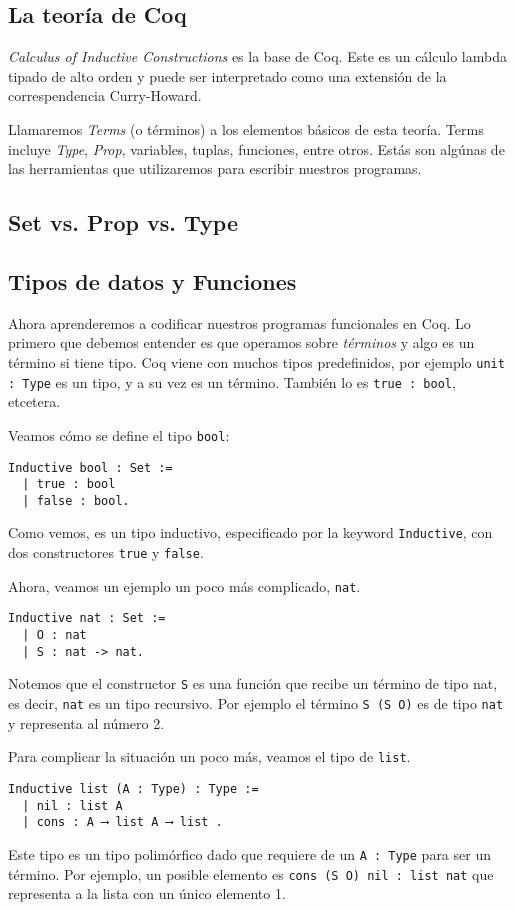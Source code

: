 \subsection{La teoría de Coq}

\textit{Calculus of Inductive Constructions} es la base de Coq. Este es un cálculo lambda tipado de alto orden y puede ser interpretado como una extensión de la correspendencia Curry-Howard.

Llamaremos \textit{Terms} (o términos) a los elementos básicos de esta teoría. Terms incluye \textit{Type}, \textit{Prop}, variables, tuplas, funciones, entre otros. Estás son algúnas de las herramientas que utilizaremos para escribir nuestros programas.

\subsection{Set vs. Prop vs. Type}

\subsection{Tipos de datos y Funciones}

Ahora aprenderemos a codificar nuestros programas funcionales en Coq. Lo primero que debemos entender es que operamos sobre \textit{términos} y algo es un término si tiene tipo. Coq viene con muchos tipos predefinidos, por ejemplo \lstinline{unit : Type} es un tipo, y a su vez es un término. También lo es \lstinline{true : bool}, etcetera.

Veamos cómo se define el tipo \lstinline{bool}:
\begin{lstlisting}
Inductive bool : Set :=
  | true : bool
  | false : bool.
\end{lstlisting}
Como vemos, es un tipo inductivo, especificado por la keyword \lstinline{Inductive}, con dos constructores \lstinline{true} y \lstinline{false}.

Ahora, veamos un ejemplo un poco más complicado, \lstinline{nat}.
\begin{lstlisting}
Inductive nat : Set :=
  | O : nat
  | S : nat -> nat.
\end{lstlisting}
Notemos que el constructor \lstinline{S} es una función que recibe un término de tipo {nat}, es decir, \lstinline{nat} es un tipo recursivo. Por ejemplo el término \lstinline{S (S O)} es de tipo \lstinline{nat} y representa al número 2.

Para complicar la situación un poco más, veamos el tipo de \lstinline{list}.
\begin{lstlisting}
Inductive list (A : Type) : Type :=
  | nil : list A
  | cons : A ⟶ list A ⟶ list .
\end{lstlisting}
Este tipo es un tipo polimórfico dado que requiere de un \lstinline{A : Type} para ser un término. Por ejemplo, un posible elemento es \lstinline{cons (S O) nil : list nat} que representa a la lista con un único elemento 1.

